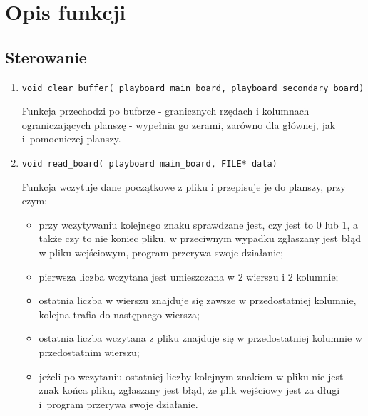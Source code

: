 \documentclass[12pt]{report}
\newcommand{\code}[1]{\texttt{#1}}
\begin{document}
\section{Opis funkcji}
\subsection{Sterowanie}
\begin{enumerate}
    \item \code{void clear\_buffer( playboard main\_board, playboard secondary\_board)}\par
    Funkcja przechodzi po buforze - granicznych rzędach i kolumnach ograniczających planszę - wypełnia go zerami, zarówno dla głównej, jak i~pomocniczej planszy.
    \item \code{void read\_board( playboard main\_board, FILE* data)}\par
    Funkcja wczytuje dane początkowe z pliku i przepisuje je do planszy, przy czym:
    \begin{itemize}
        \item przy wczytywaniu kolejnego znaku sprawdzane jest, czy jest to 0 lub 1, a także czy to nie koniec pliku, w przeciwnym wypadku zgłaszany jest błąd w pliku wejściowym, program przerywa swoje działanie;
        \item pierwsza liczba wczytana jest umieszczana w 2 wierszu i 2 kolumnie;
        \item ostatnia liczba w wierszu znajduje się zawsze w przedostatniej kolumnie, kolejna trafia do następnego wiersza;
        \item ostatnia liczba wczytana z pliku znajduje się w przedostatniej kolumnie w przedostatnim wierszu;
        \item jeżeli po wczytaniu ostatniej liczby kolejnym znakiem w pliku nie jest znak końca pliku, zgłaszany jest błąd, że plik wejściowy jest za długi i~program przerywa swoje działanie.
    \end{itemize}
\end{enumerate}
\end{document}
